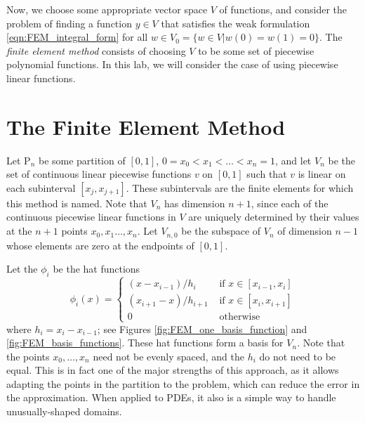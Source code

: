 Now, we choose some appropriate vector space \(V\) of functions, and consider the problem of finding a function $y\in V$ that satisfies the weak formulation \eqref{eqn:FEM_integral_form} for all $w\in V_0 = \{w \in V|w(0) = w(1) = 0\}$.
The \textit{finite element method} consists of choosing \(V\) to be some set of piecewise polynomial functions.
In this lab, we will consider the case of using piecewise linear functions.

\section*{The Finite Element Method}

Let $\mathrm{P}_n$ be some partition of $[0,1]$, $0 = x_0 < x_1< \ldots < x_{n} = 1$, and let $V_n$ be the set of continuous linear piecewise functions $v$ on $[0,1]$ such that $v$ is linear on each subinterval $[x_j,x_{j+1}]$.
These subintervals are the finite elements for which this method is named.
Note that $V_n$ has dimension $n+1$, since each of the continuous piecewise linear functions in $V$ are uniquely determined by their values at the \(n+1\) points \(x_0,x_1\ldots,x_n\).
Let $V_{n,0}$ be the subspace of $V_n$ of dimension $n-1$ whose elements are zero at the endpoints of $[0,1]$.


Let the $\phi_i$ be the hat functions 
\[\phi_i(x) = \begin{cases}
(x - x_{i-1})/h_i &\text{ if } x \in [x_{i-1},x_i]\\
 (x_{i+1} - x)/h_{i+1}  &\text{ if } x \in [x_{i},x_{i+1}]\\
0 &\text{ otherwise}
\end{cases}\]
where $h_i = x_i - x_{i-1}$; see Figures \ref{fig:FEM_one_basis_function} and \ref{fig:FEM_basis_functions}. 
These hat functions form a basis for $V_n$.
Note that the points \(x_0,\ldots,x_n\) need not be evenly spaced, and the \(h_i\) do not need to be equal.
This is in fact one of the major strengths of this approach, as it allows adapting the points in the partition to the problem, which can reduce the error in the approximation.
When applied to PDEs, it also is a simple way to handle unusually-shaped domains.

